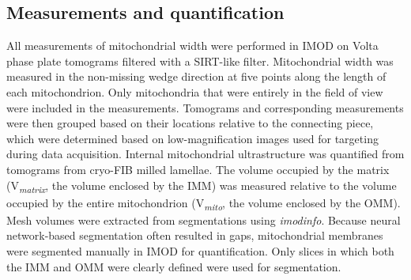 \subsection*{Measurements and quantification}
All measurements of mitochondrial width were performed in IMOD on Volta phase plate tomograms filtered with a SIRT-like filter. Mitochondrial width was measured in the non-missing wedge direction at five points along the length of each mitochondrion. Only mitochondria that were entirely in the field of view were included in the measurements. Tomograms and corresponding measurements were then grouped based on their locations relative to the connecting piece, which were determined based on low-magnification images used for targeting during data acquisition. Internal mitochondrial ultrastructure was quantified from tomograms from cryo-FIB milled lamellae. The volume occupied by the matrix (V\textsubscript{\emph{matrix}}, the volume enclosed by the IMM) was measured relative to the volume occupied by the entire mitochondrion (V\textsubscript{\emph{mito}}, the volume enclosed by the OMM). Mesh volumes were extracted from segmentations using \emph{imodinfo}. Because neural network-based segmentation often resulted in gaps, mitochondrial membranes were segmented manually in IMOD for quantification. Only slices in which both the IMM and OMM were clearly defined were used for segmentation.
%
